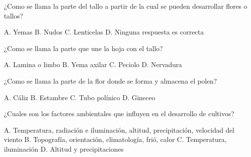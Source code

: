 \documentclass[11pt]{exam}
\begin{document}
{\begin{questions}
\question ¿Como se llama la parte del tallo a partir de la cual se pueden
  desarrollar flores o tallos?
  \begin{checkboxes}
    \CorrectChoice A. Yemas
    \choice B. Nudos
    \choice C. Lenticelas
    \choice D. Ninguna respuesta es correcta
  \end{checkboxes}

\question ¿Como se llama la parte que une la hoja con el tallo?
  \begin{checkboxes}
    \choice A. Lamina o limbo
    \choice B. Yema axilar
    \CorrectChoice C. Peciolo
    \choice D. Nervadura
  \end{checkboxes}

\question ¿Como se llama la parte de la flor donde se forma y almacena el polen?
  \begin{checkboxes}
    \choice A. Cáliz
    \CorrectChoice B. Estambre
    \choice C. Tubo polínico
    \choice D. Gineceo
  \end{checkboxes}

\question ¿Cuales son los factores ambientales que influyen en el desarrollo de
  cultivos?
  \begin{checkboxes}
    \CorrectChoice A. Temperatura, radiación e iluminación, altitud, precipitación,
    velocidad del viento
    \choice B. Topografía, orientación, climatología, frió, calor
    \choice C. Temperatura, iluminación
    \choice D. Altitud y precipitaciones
  \end{checkboxes}
\end{questions}

}
\end{document}
